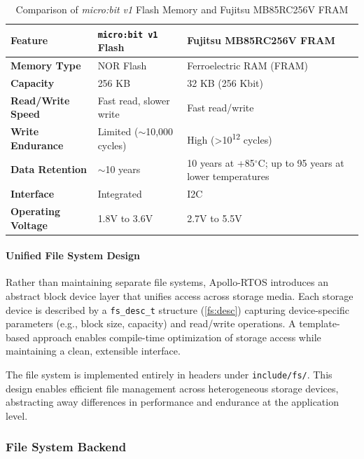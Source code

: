 \begin{table}[h]
    \ifsubmission {}
    \else
        \def\arraystretch{1.2}
    \fi
    \centering \caption{Comparison of \textit{micro:bit v1} Flash Memory and Fujitsu
    MB85RC256V FRAM}
    \begin{tabular}{@{} l p{4.3cm} p{5.5cm} @{}} 
        \toprule \textbf{Feature} & \textbf{\texttt{micro:bit v1} Flash} & \textbf{Fujitsu
        MB85RC256V FRAM} \\
        \midrule \textbf{Memory Type} & NOR Flash & Ferroelectric RAM (FRAM) \\
        \textbf{Capacity} & 256 KB & 32 KB (256 Kbit) \\
        \textbf{Read/Write Speed} & Fast read, slower write & Fast read/write \\
        \textbf{Write Endurance} & Limited ($\sim$10,000 cycles) & High
        (>10\textsuperscript{12} cycles) \\
        \textbf{Data Retention} & \(\sim\)10 years & 10 years at +85$^{\circ}$C; up to
        95 years at lower temperatures \\
        \textbf{Interface} & Integrated & I2C \\
        \textbf{Operating Voltage} & 1.8V to 3.6V & 2.7V to 5.5V \\
        \bottomrule
    \end{tabular}
\end{table}

\paragraph*{Unified File System Design} Rather than maintaining separate file systems,
Apollo-RTOS introduces an abstract block device layer that unifies access across
storage media. Each storage device is described by a \lstinline[style=myagc]|fs_desc_t|
structure (\autoref{fs:desc}) capturing device-specific parameters (e.g., block size,
capacity) and read/write operations. A template-based approach enables compile-time
optimization of storage access while maintaining a clean, extensible interface.

The file system is implemented entirely in headers under \texttt{include/fs/}. This
design enables efficient file management across heterogeneous storage devices,
abstracting away differences in performance and endurance at the application level.


\subsubsection{File System Backend}


